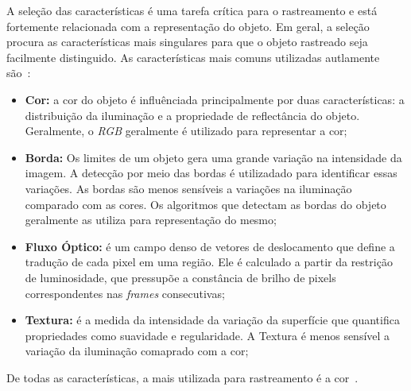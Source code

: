 	A seleção das características é uma tarefa crítica para o rastreamento e está fortemente relacionada com a representação do objeto. Em geral, a seleção procura as características mais singulares para que o objeto rastreado seja facilmente distinguido. As características mais comuns utilizadas autlamente são~\cite{yilmaz}:

	\begin{itemize}
		\item \textbf{Cor:} a cor do objeto é influênciada principalmente por duas características: a distribuição da iluminação e a propriedade de reflectância do objeto. Geralmente, o \textit{RGB} geralmente é utilizado para representar a cor;

		\item \textbf{Borda:} Os limites de um objeto gera uma grande variação na intensidade da imagem. A detecção por meio das bordas é utilizadado para identificar essas variações. As bordas são menos sensíveis a variações na iluminação comparado com as cores. Os algoritmos que detectam as bordas do objeto geralmente as utiliza para representação do mesmo;

		\item \textbf{Fluxo Óptico:} é um campo denso de vetores de deslocamento que define a tradução de cada pixel em uma região. Ele é calculado a partir da restrição de luminosidade, que pressupõe a constância de brilho de pixels correspondentes nas \textit{frames} consecutivas;

		\item \textbf{Textura:} é a medida da intensidade da variação da superfície que quantifica propriedades como suavidade e regularidade. A Textura é menos sensível a variação da iluminação comaprado com a cor;

	\end{itemize}

	De todas as características, a mais utilizada para rastreamento é a cor~\cite{yilmaz}.









